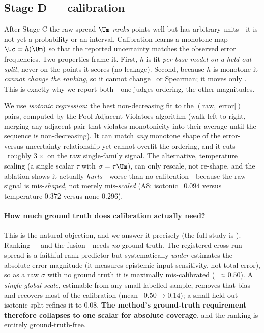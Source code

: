 \subsection{Stage D --- calibration}
\label{sec:method-calib}

After Stage C the raw spread $\Um$ \emph{ranks} points well but has arbitrary units---it is not yet a
probability or an interval. Calibration learns a monotone map $\Uc = h(\Um)$ so that the reported
uncertainty matches the observed error frequencies. Two properties frame it. First, $h$ is fit
\emph{per base-model on a held-out split}, never on the points it scores (no leakage). Second,
because $h$ is monotone it \emph{cannot change the ranking}, so it cannot change \ause\ or Spearman;
it moves only \ece. This is exactly why we report both---one judges ordering, the other magnitudes.

We use \emph{isotonic regression}: the best non-decreasing fit to the $(\text{raw},|\text{error}|)$
pairs, computed by the Pool-Adjacent-Violators algorithm (walk left to right, merging any adjacent
pair that violates monotonicity into their average until the sequence is non-decreasing). It can
match \emph{any} monotone shape of the error-versus-uncertainty relationship yet cannot overfit the
ordering, and it cuts \ece\ roughly $3\times$ on the raw single-family signal. The alternative,
temperature scaling (a single scalar $\tau$ with $\sigma=\tau\Um$), can only rescale, not re-shape,
and the ablation shows it actually \emph{hurts}---worse than no calibration---because the raw signal
is mis-\emph{shaped}, not merely mis-\emph{scaled} (A8: isotonic \ece\ $0.094$ versus temperature
$0.372$ versus none $0.296$).

\paragraph{How much ground truth does calibration actually need?} This is the natural objection, and
we answer it precisely (the full study is ). Ranking---\ause\ and the
fusion---needs \emph{no} ground truth. The registered cross-run spread is a faithful rank predictor
but systematically \emph{under}-estimates the absolute error magnitude (it measures epistemic
input-sensitivity, not total error), so as a raw $\sigma$ with no ground truth it is maximally
mis-calibrated (\ece\ $\approx 0.50$). A \emph{single global scale}, estimable from any small labelled
sample, removes that bias and recovers most of the calibration (mean \ece\ $0.50\to0.14$); a small
held-out isotonic split refines it to $0.08$. \textbf{The method's ground-truth requirement therefore
collapses to one scalar for absolute coverage}, and the ranking is entirely ground-truth-free.

